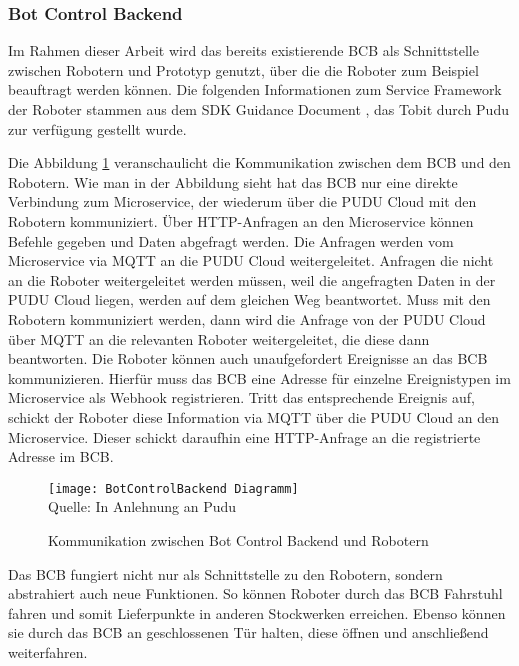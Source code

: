 \subsubsection{Bot Control Backend}\label{sec:BotControlBackend}
Im Rahmen dieser Arbeit wird das bereits existierende \ac{BCB} als Schnittstelle zwischen Robotern und Prototyp genutzt, über die die Roboter zum Beispiel beauftragt werden können. Die folgenden Informationen zum Service Framework der Roboter stammen aus dem SDK Guidance Document \cite{PuduSDK}, das Tobit durch Pudu zur verfügung gestellt wurde.

Die Abbildung \ref{fig:BotControlBackendCommunication} veranschaulicht die Kommunikation zwischen dem \ac{BCB} und den Robotern. Wie man in der Abbildung sieht hat das \ac{BCB} nur eine direkte Verbindung zum Microservice, der wiederum über die PUDU Cloud mit den Robotern kommuniziert. Über \gls{HTTP}-Anfragen an den Microservice können Befehle gegeben und Daten abgefragt werden. Die Anfragen werden vom Microservice via \gls{MQTT} an die PUDU Cloud weitergeleitet. Anfragen die nicht an die Roboter weitergeleitet werden müssen, weil die angefragten Daten in der PUDU Cloud liegen, werden auf dem gleichen Weg beantwortet. Muss mit den Robotern kommuniziert werden, dann wird die Anfrage von der PUDU Cloud über \gls{MQTT} an die relevanten Roboter weitergeleitet, die diese dann beantworten. Die Roboter können auch unaufgefordert Ereignisse an das \ac{BCB} kommunizieren. Hierfür muss das \ac{BCB} eine Adresse für einzelne Ereignistypen im Microservice als \gls{Webhook} registrieren. Tritt das entsprechende Ereignis auf, schickt der Roboter diese Information via \gls{MQTT} über die PUDU Cloud an den Microservice. Dieser schickt daraufhin eine HTTP-Anfrage an die registrierte Adresse im \ac{BCB}.

\begin{figure}[H]
\caption{Kommunikation zwischen Bot Control Backend und Robotern}\label{fig:BotControlBackendCommunication}
\texttt{[image: BotControlBackend Diagramm]}
\\
Quelle: In Anlehnung an Pudu \cite[S.~4]{PuduSDK}
\end{figure}

Das \ac{BCB} fungiert nicht nur als Schnittstelle zu den Robotern, sondern abstrahiert auch neue Funktionen. So können Roboter durch das \ac{BCB} Fahrstuhl fahren und somit Lieferpunkte in anderen Stockwerken erreichen. Ebenso können sie durch das \ac{BCB} an geschlossenen Tür halten, diese öffnen und anschließend weiterfahren.

